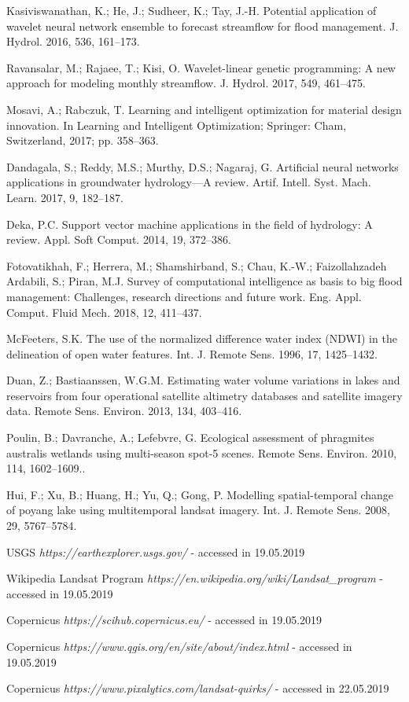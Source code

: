 \documentclass[12pt, a4paper]{report}
\begin{document}
\begin{thebibliography}{widest entry}
Kasiviswanathan, K.; He, J.; Sudheer, K.; Tay, J.-H. Potential application of wavelet neural network ensemble to forecast streamflow for flood management. J. Hydrol. 2016, 536, 161–173.

Ravansalar, M.; Rajaee, T.; Kisi, O. Wavelet-linear genetic programming: A new approach for modeling monthly streamflow. J. Hydrol. 2017, 549, 461–475.

Mosavi, A.; Rabczuk, T. Learning and intelligent optimization for material design innovation. In Learning and Intelligent Optimization; Springer: Cham, Switzerland, 2017; pp. 358–363.

Dandagala, S.; Reddy, M.S.; Murthy, D.S.; Nagaraj, G. Artificial neural networks applications in groundwater hydrology—A review. Artif. Intell. Syst. Mach. Learn. 2017, 9, 182–187.

Deka, P.C. Support vector machine applications in the field of hydrology: A review. Appl. Soft Comput. 2014,
19, 372–386.

Fotovatikhah, F.; Herrera, M.; Shamshirband, S.; Chau, K.-W.; Faizollahzadeh Ardabili, S.; Piran, M.J. Survey of computational intelligence as basis to big flood management: Challenges, research directions and future work. Eng. Appl. Comput. Fluid Mech. 2018, 12, 411–437. 

McFeeters, S.K. The use of the normalized difference water index (NDWI) in the delineation of open water features. Int. J. Remote Sens. 1996, 17, 1425–1432.

Duan, Z.; Bastiaanssen, W.G.M. Estimating water volume variations in lakes and reservoirs from four operational satellite altimetry databases and satellite imagery data. Remote Sens. Environ. 2013, 134, 403–416.

Poulin, B.; Davranche, A.; Lefebvre, G. Ecological assessment of phragmites australis wetlands using multi-season spot-5 scenes. Remote Sens. Environ. 2010, 114, 1602–1609..

Hui, F.; Xu, B.; Huang, H.; Yu, Q.; Gong, P. Modelling spatial-temporal change of poyang lake using multitemporal landsat imagery. Int. J. Remote Sens. 2008, 29, 5767–5784.

USGS \textit{https://earthexplorer.usgs.gov/} - accessed in 19.05.2019


Wikipedia Landsat Program \textit{https://en.wikipedia.org/wiki/Landsat\_program} - accessed in 19.05.2019

Copernicus \textit{https://scihub.copernicus.eu/} - accessed in 19.05.2019

Copernicus \textit{https://www.qgis.org/en/site/about/index.html} - accessed in 19.05.2019

Copernicus \textit{https://www.pixalytics.com/landsat-quirks/} - accessed in 22.05.2019

\end{thebibliography}






\end{document}
